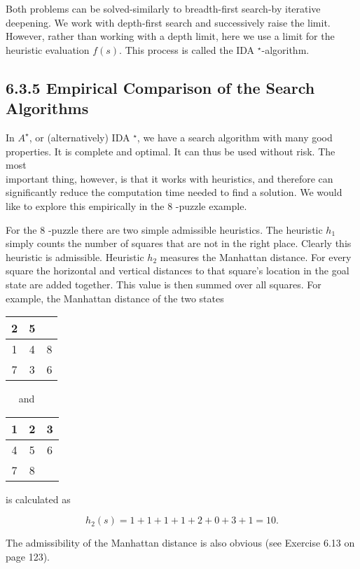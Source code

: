 \documentclass[10pt]{article}
\begin{document}
Both problems can be solved-similarly to breadth-first search-by iterative deepening. We work with depth-first search and successively raise the limit. However, rather than working with a depth limit, here we use a limit for the heuristic evaluation $f(s)$. This process is called the IDA ${ }^{\star}$-algorithm.

\subsection*{6.3.5 Empirical Comparison of the Search Algorithms}
In $A^{\star}$, or (alternatively) IDA ${ }^{\star}$, we have a search algorithm with many good properties. It is complete and optimal. It can thus be used without risk. The most\\
important thing, however, is that it works with heuristics, and therefore can significantly reduce the computation time needed to find a solution. We would like to explore this empirically in the 8 -puzzle example.

For the 8 -puzzle there are two simple admissible heuristics. The heuristic $h_{1}$ simply counts the number of squares that are not in the right place. Clearly this heuristic is admissible. Heuristic $h_{2}$ measures the Manhattan distance. For every square the horizontal and vertical distances to that square's location in the goal state are added together. This value is then summed over all squares. For example, the Manhattan distance of the two states

\begin{center}
\begin{tabular}{|c|c|c|}
\hline
2 & 5 &  \\
\hline
1 & 4 & 8 \\
\hline
7 & 3 & 6 \\
\hline\hline
\end{tabular}
\end{center}$\quad$ and $\quad$\begin{tabular}{|c|c|c|}
\hline
1 & 2 & 3 \\
\hline
4 & 5 & 6 \\
\hline
7 & 8 &  \\
\hline
\end{tabular}

is calculated as

$$
h_{2}(s)=1+1+1+1+2+0+3+1=10 .
$$

The admissibility of the Manhattan distance is also obvious (see Exercise 6.13 on page 123).
\end{document}
